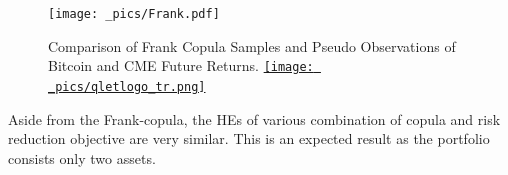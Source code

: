 \begin{figure}[th]
   \centering
   \texttt{[image: \_pics/Frank.pdf]}
   \caption{Comparison of Frank Copula Samples and Pseudo Observations of Bitcoin and CME Future Returns.
   \href{http://www.quantlet.com/}{\texttt{[image: \_pics/qletlogo\_tr.png]}}}
   \label{fig:Frank}
\end{figure} \medskip

Aside from the Frank-copula, the HEs of various combination of copula and risk reduction objective are very similar.
This is an expected result as the portfolio consists only two assets.






%
%

%


